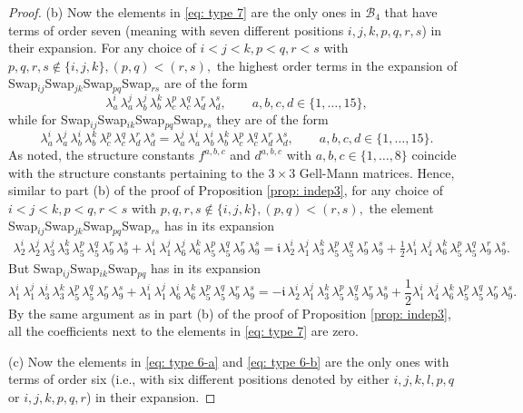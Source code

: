 \documentclass[12pt,dvipsnames,accepted=2016-08-18,a4paper,onecolumn]{quantumarticle}
\numberwithin{equation}{section}
\theoremstyle{definition}
\begin{document}
\begin{proof}
	(b) Now the elements in \eqref{eq: type 7} are the only ones in $\mathcal{B}_4$ that have terms of order seven (meaning with seven different positions $i,j,k,p,q,r,s$) in their expansion. For any choice of  $i < j < k, p<q, r<s$ with $p,q,r,s \notin \{i,j,k\}, (p,q)<(r,s),$ the highest order terms in the expansion of Swap$_{ij}$Swap$_{jk}$Swap$_{pq}$Swap$_{rs}$ are of the form
	$$
	\lambda_a^i\, \lambda_a^j\, \lambda_b^j\, \lambda_b^k\, \lambda_c^p\, \lambda_c^q\, \lambda_d^r\, \lambda_d^s, 
	\quad \quad a,b,c,d \in \{1,\ldots,15\},
	$$
	while for Swap$_{ij}$Swap$_{ik}$Swap$_{pq}$Swap$_{rs}$ they are of the form
	$$
	\lambda_a^i\, \lambda_a^j\, \lambda_b^i\, \lambda_b^k\, \lambda_c^p\, \lambda_c^q\, \lambda_d^r\, \lambda_d^s = \lambda_a^j\,\lambda_a^i\,  \lambda_b^i\, \lambda_b^k\, \lambda_c^p\, \lambda_c^q\, \lambda_d^r\, \lambda_d^s ,
	\quad \quad a,b,c,d \in \{1,\ldots,15\}.
	$$
	As noted, the structure constants $f^{a,b,c}$ and $d^{a,b,c}$ with $a,b,c\in\{1,\ldots,8\}$ coincide with the structure constants pertaining to the $3 \times 3$ Gell-Mann matrices.
	Hence, similar to part (b) of the proof of Proposition \ref{prop: indep3}, for any choice of $i < j < k, p<q, r<s$ with $p,q,r,s \notin \{i,j,k\}, (p,q)<(r,s),$  the element Swap$_{ij}$Swap$_{jk}$Swap$_{pq}$Swap$_{rs}$ has in its expansion
	\begin{align*}
		\lambda_2^i\, \lambda_2^j\, \lambda_3^j\, \lambda_3^k\, \lambda_5^p\, \lambda_5^q\, \lambda_9^r\, \lambda_9^s + \lambda_1^i\, \lambda_1^j\, \lambda_6^j\, \lambda_6^k\, \lambda_5^p\, \lambda_5^q\, \lambda_9^r\, \lambda_9^s =
		\mathfrak{i}\,\lambda_2^i\, \lambda_1^j\, \lambda_3^k\, \lambda_5^p\, \lambda_5^q\, \lambda_9^r\, \lambda_9^s + \frac{1}{2} \lambda_1^i\, \lambda_4^j\, \lambda_6^k\, \lambda_5^p\, \lambda_5^q\, \lambda_9^r\, \lambda_9^s.
	\end{align*}
	But Swap$_{ij}$Swap$_{ik}$Swap$_{pq}$ has in its expansion
	$$
	\lambda_1^i\, \lambda_1^j\, \lambda_3^i\, \lambda_3^k\, \lambda_5^p\, \lambda_5^q\, \lambda_9^r\, \lambda_9^s + \lambda_1^i\, \lambda_1^j\, \lambda_6^i\, \lambda_6^k\, \lambda_5^p\, \lambda_5^q\, \lambda_9^r\, \lambda_9^s =
	-\mathfrak{i}\,\lambda_2^i\, \lambda_1^j\, \lambda_3^k\, \lambda_5^p\, \lambda_5^q\, \lambda_9^r\, \lambda_9^s + \frac{1}{2} \lambda_1^i\, \lambda_4^j\, \lambda_6^k\, \lambda_5^p\, \lambda_5^q\, \lambda_9^r\, \lambda_9^s.
	$$
	By the same argument as in part (b) of the proof of Proposition \ref{prop: indep3}, all the coefficients next to the elements in \eqref{eq: type 7} are zero.
	
	(c) Now the elements in \eqref{eq: type 6-a} and \eqref{eq: type 6-b} are the only ones with terms of order six (i.e., with six different positions denoted by either $i,j,k,l,p,q$ or $i,j,k,p,q,r$) in their expansion.
	

\end{proof}
\end{document}
